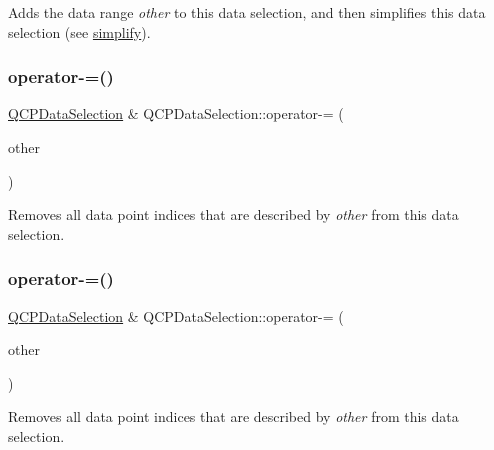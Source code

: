Adds the data range {\itshape other} to this data selection, and then simplifies this data selection (see \hyperlink{classQCPDataSelection_a4a2fbad1a6e4d1dd26fdfdf88956f2a4}{simplify}). \mbox{\label{classQCPDataSelection_a66f9fab70b026baa64bf8e52fe5de07e}} 
\subsubsection{\texorpdfstring{operator-\/=()}{operator-=()}\hspace{0.1cm}{\footnotesize\ttfamily [1/2]}}
{\footnotesize\ttfamily \hyperlink{classQCPDataSelection}{Q\+C\+P\+Data\+Selection} \& Q\+C\+P\+Data\+Selection\+::operator-\/= (\begin{DoxyParamCaption}\item[{const \hyperlink{classQCPDataSelection}{Q\+C\+P\+Data\+Selection} \&}]{other }\end{DoxyParamCaption})}

Removes all data point indices that are described by {\itshape other} from this data selection. \mbox{\label{classQCPDataSelection_a8d18b20d20dde737eefc10967e31cf73}} 
\subsubsection{\texorpdfstring{operator-\/=()}{operator-=()}\hspace{0.1cm}{\footnotesize\ttfamily [2/2]}}
{\footnotesize\ttfamily \hyperlink{classQCPDataSelection}{Q\+C\+P\+Data\+Selection} \& Q\+C\+P\+Data\+Selection\+::operator-\/= (\begin{DoxyParamCaption}\item[{const \hyperlink{classQCPDataRange}{Q\+C\+P\+Data\+Range} \&}]{other }\end{DoxyParamCaption})}

Removes all data point indices that are described by {\itshape other} from this data selection. \mbox{\label{classQCPDataSelection_a664fa566569b17148abafd6b1dbbf347}} 
